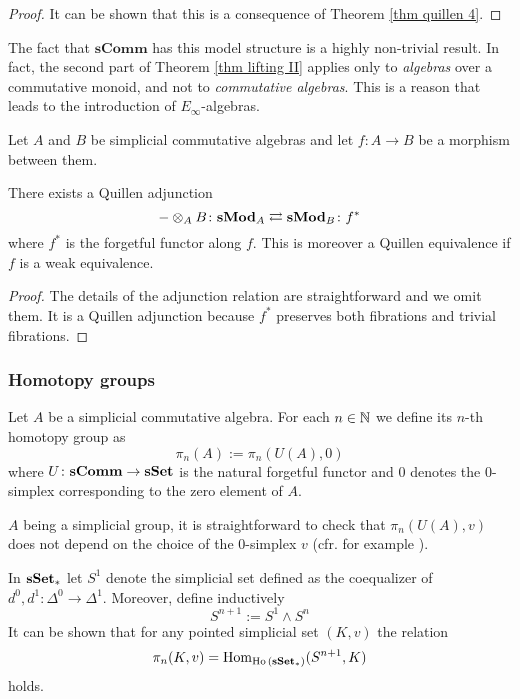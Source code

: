 \begin{refsection}
\begin{proof}
It can be shown that this is a consequence of Theorem \ref{thm quillen 4}.
\end{proof}

\begin{rmk}
The fact that $\mathbf{sComm}$ has this model structure is a highly non-trivial result. In fact, the second part of Theorem \ref{thm lifting II} applies only to \emph{algebras} over a commutative monoid, and not to \emph{commutative algebras}. This is a reason that leads to the introduction of $E_\infty$-algebras.
\end{rmk}

Let $A$ and $B$ be simplicial commutative algebras and let $f \colon A \to B$ be a morphism between them.

\begin{lemma}
There exists a Quillen adjunction
\[
- \otimes_A B \colon \mathbf s \mathbf{Mod}_A \rightleftarrows \mathbf s \mathbf{Mod}_B \colon f^*
\]
where $f^*$ is the forgetful functor along $f$. This is moreover a Quillen equivalence if $f$ is a weak equivalence.
\end{lemma}

\begin{proof}
The details of the adjunction relation are straightforward and we omit them. It is a Quillen adjunction because $f^*$ preserves both fibrations and trivial fibrations.
\end{proof}

\subsubsection{Homotopy groups}

Let $A$ be a simplicial commutative algebra. For each $n \in \mathbb{N}$ we define its $n$-th homotopy group as
\[
\pi_n(A) := \pi_n(U(A),0)
\]
where $U \colon \mathbf{sComm} \to \mathbf{sSet}$ is the natural forgetful functor and $0$ denotes the $0$-simplex corresponding to the zero element of $A$.

\begin{rmk}
$A$ being a simplicial group, it is straightforward to check that $\pi_n(U(A),v)$ does not depend on the choice of the $0$-simplex $v$ (cfr. for example \cite[Ex. 8.3.1]{weibel}).
\end{rmk}

\begin{rmk}
In $\mathbf{sSet}_*$ let $S^1$ denote the simplicial set defined as the coequalizer of $d^0,d^1 \colon \Delta^0 \to \Delta^1$. Moreover, define inductively
\[
S^{n+1} := S^1 \wedge S^n
\]
It can be shown that for any pointed simplicial set $(K,v)$ the relation
\[
\pi_n(K,v) = \mathrm{Hom}_{\operatorname{\mathrm{Ho} \,}(\mathbf{sSet}_*)}(S^{n+1},K)
\]
holds.
\end{rmk}


\end{refsection}
